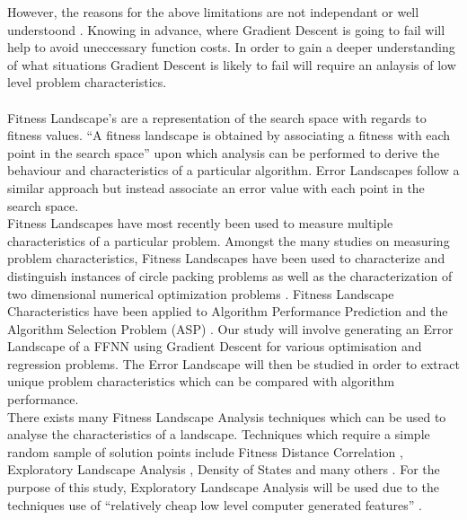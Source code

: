 \documentclass[runningheads,a4paper]{llncs}
\begin{document}
However, the reasons for the above limitations are not independant or well understoond \cite{baldi1995gradient}. Knowing in advance, where Gradient 
Descent is going to fail will help to avoid uneccessary function costs. In order to gain a deeper understanding of what situations Gradient Descent is likely to fail
will require an anlaysis of low level problem characteristics.
\\\\
Fitness Landscape's are a representation of the search space with regards to
fitness values\cite{merkuryeva2010comparative}. ``A fitness landscape is obtained by associating a fitness with each point in the search space''\cite{uludag2009fitness} upon which analysis can be performed to derive
the behaviour and characteristics of a particular algorithm. Error Landscapes follow a similar approach but instead associate an error value with each point in the search space.
\\
Fitness Landscapes have most recently been used to measure multiple characteristics of a particular problem. Amongst the many studies on measuring problem characteristics, Fitness Landscapes have been used to characterize
and distinguish instances of circle packing problems \cite{morgan2014fitness} as well as the characterization of two dimensional numerical optimization problems \cite{munoz2012landscape}. Fitness Landscape Characteristics 
have been applied to Algorithm Performance Prediction \cite{smith2008towards,malan2014particle,mersmann2013novel} and the Algorithm Selection Problem (ASP) \cite{bischl2012algorithm}. Our study will involve generating an Error Landscape of
a FFNN using Gradient Descent for various optimisation and regression problems. The Error Landscape will then be studied in order to extract unique problem characteristics which can be compared with algorithm performance.
\\
There exists many Fitness Landscape Analysis techniques which can be used to analyse the characteristics of a landscape. Techniques which require a simple random sample of solution points include Fitness Distance Correlation \cite{gallagher2001fitness}, 
Exploratory Landscape Analysis \cite{mersmann2011exploratory}, Density of States \cite{rose1996density} and many others \cite{malan2013survey}. For the purpose of this study, Exploratory Landscape Analysis 
will be used due to the techniques use of ``relatively cheap low level computer generated features'' \cite{mersmann2011exploratory}.
\\\\
\end{document}

